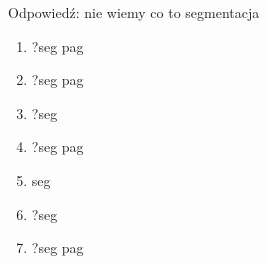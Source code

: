 Odpowiedź:
nie wiemy co to segmentacja
\begin{enumerate}
    \item ?seg pag
    \item ?seg pag
    \item ?seg
    \item ?seg pag
    \item seg
    \item ?seg
    \item ?seg pag
\end{enumerate}